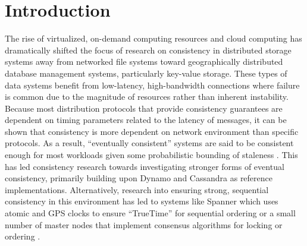 \documentclass{article}
\begin{document}
\newpage
\setcounter{tocdepth}{2}
\tableofcontents

\newpage
\listoffigures

\newpage
\doublespacing



\section{Introduction}

The rise of virtualized, on-demand computing resources and cloud computing has dramatically shifted the focus of research on consistency in distributed storage systems away from networked file systems toward geographically distributed database management systems, particularly key-value storage. These types of data systems benefit from low-latency, high-bandwidth connections where failure is common due to the magnitude of resources rather than inherent instability. Because most distribution protocols that provide consistency guarantees are dependent on timing parameters related to the latency of messages, it can be shown that consistency is more dependent on network environment than specific protocols. As a result, ``eventually consistent'' \cite{vogels_eventually_2009} systems are said to be consistent enough for most workloads given some probabilistic bounding of staleness \cite{bailis_quantifying_2014,bermbach_eventual_2011,bailis_probabilistically_2012}. This has led consistency research towards investigating stronger forms of eventual consistency, primarily building upon Dynamo \cite{decandia_dynamo:_2007} and Cassandra \cite{lakshman_cassandra:_2010} as reference implementations. Alternatively, research into ensuring strong, sequential consistency in this environment has led to systems like Spanner \cite{corbett_spanner:_2013} which uses atomic and GPS clocks to ensure ``TrueTime'' for sequential ordering or a small number of master nodes that implement consensus algorithms \cite{lamport_paxos_2001,ongaro_search_2014} for locking or ordering \cite{kraska_mdcc:_2013}.
\end{document}
